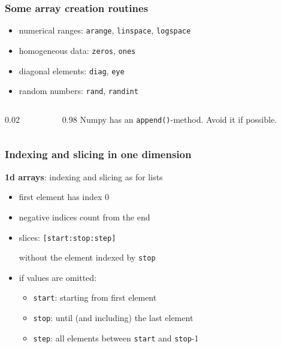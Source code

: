 \begin{frame}[fragile]\frametitle{Some array creation routines}

 \begin{itemize}
  \item numerical ranges:
        \lstinline{arange}, \lstinline{linspace}, \lstinline{logspace}
  \item homogeneous data:
        \lstinline{zeros}, \lstinline{ones}
  \item diagonal elements:
        \lstinline{diag}, \lstinline{eye}
  \item random numbers:
        \lstinline{rand}, \lstinline{randint}
 \end{itemize}

 \vspace{0.3truecm}
 \begin{columns}
  \begin{column}{0.02\linewidth}
   \alert{\raisebox{1.0em}{}}
  \end{column}%
  \begin{column}{0.98\linewidth}
   \alert{Numpy has an \lstinline{append()}-method. Avoid it if possible.}
  \end{column}
 \end{columns}

 \vspace{0.3truecm}
\end{frame}

\begin{frame}[fragile]\frametitle{Indexing and slicing in one dimension}
 \textbf{1d arrays}: indexing and slicing as for lists

 \begin{itemize}
  \item first element has index 0
  \item negative indices count from the end
  \item slices: \lstinline{[start:stop:step]}\\
        \strut\hphantom{slices:\ }  without the element indexed by \lstinline{stop}
  \item if values are omitted:
        \begin{itemize}
         \item \lstinline{start}: starting from first element
         \item \lstinline{stop}: until (and including) the last element
         \item \lstinline{step}: all elements between \lstinline{start} and \lstinline{stop}-1
        \end{itemize}
 \end{itemize}

\end{frame}

